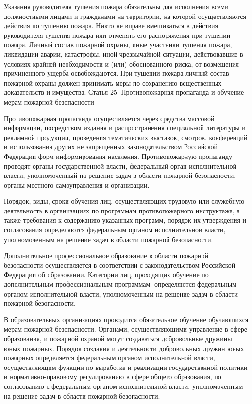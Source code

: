 \documentclass[a4paper, 12pt]{article}
\theoremstyle{definition}
\begin{document}
        Указания руководителя тушения пожара обязательны для исполнения всеми должностными лицами и гражданами на территории, на которой осуществляются действия по тушению пожара.
        Никто не вправе вмешиваться в действия руководителя тушения пожара или отменять его распоряжения при тушении пожара.
        Личный состав пожарной охраны, иные участники тушения пожара, ликвидации аварии, катастрофы, иной чрезвычайной ситуации, действовавшие в условиях крайней необходимости и (или) обоснованного риска, от возмещения причиненного ущерба освобождаются.
        При тушении пожара личный состав пожарной охраны должен принимать меры по сохранению вещественных доказательств и имущества.
        Статья 25. Противопожарная пропаганда и обучение мерам пожарной безопасности

        Противопожарная пропаганда осуществляется через средства массовой информации, посредством издания и распространения специальной литературы и рекламной продукции, проведения тематических выставок, смотров, конференций и использования других не запрещенных законодательством Российской Федерации форм информирования населения. Противопожарную пропаганду проводят органы государственной власти, федеральный орган исполнительной власти, уполномоченный на решение задач в области пожарной безопасности, органы местного самоуправления и организации.

        Порядок, виды, сроки обучения лиц, осуществляющих трудовую или служебную деятельность в организациях по программам противопожарного инструктажа, а также требования к содержанию указанных программ, порядок их утверждения и согласования определяются федеральным органом исполнительной власти, уполномоченным на решение задач в области пожарной безопасности.

        Дополнительное профессиональное образование в области пожарной\\ безопасности осуществляется в соответствии с законодательством Российской Федерации об образовании. Категории лиц, проходящих обучение по дополнительным профессиональным программам, определяются федеральным органом исполнительной власти, уполномоченным на решение задач в области пожарной безопасности.

        В образовательных организациях проводится обязательное обучение обучающихся мерам пожарной безопасности. Органами, осуществляющими управление в сфере образования, и пожарной охраной могут создаваться добровольные дружины юных пожарных. Порядок создания и деятельности добровольных дружин юных пожарных определяется федеральным органом исполнительной власти, осуществляющим функции по выработке и реализации государственной политики и нормативно-правовому регулированию в сфере общего образования, по согласованию с федеральным органом исполнительной власти, уполномоченным на решение задач в области пожарной безопасности.
\end{document}
